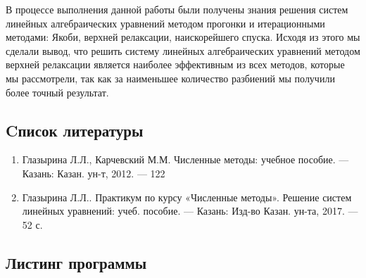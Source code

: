 \documentclass[a4paper,12pt]{article}
\begin{document}
\hspace{0.5cm} В процессе выполнения данной работы были получены знания решения систем 
линейных алгебраических уравнений методом прогонки и итерационными методами: 
Якоби, верхней релаксации, наискорейшего спуска. Исходя из этого мы сделали вывод, 
что решить систему линейных алгебраических уравнений методом верхней релаксации является наиболее эффективным
из всех методов, которые мы рассмотрели, так как за наименьшее количество разбиений мы получили более точный результат.
\newpage

\begin{center}
\section{Cписок литературы}
\end{center}
\begin{enumerate}
    \item Глазырина Л.Л., Карчевский М.М. Численные методы: учебное пособие. — Казань: Казан.
    ун-т, 2012. — 122 
    \item Глазырина Л.Л.. Практикум по курсу «Численные методы». Решение
    систем линейных уравнений: учеб. пособие. — Казань: Изд-во Казан. ун-та, 2017. — 52 с.
\end{enumerate}
\newpage

\begin{center}
\section{Листинг программы}
\end{center}

\end{document}
